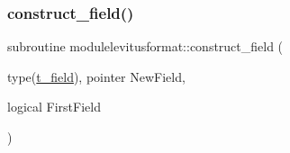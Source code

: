 \mbox{\label{namespacemodulelevitusformat_a1dfa75e5e2a006d4bcbca7bbb3e74ced}} 
\subsubsection{\texorpdfstring{construct\+\_\+field()}{construct\_field()}}
{\footnotesize\ttfamily subroutine modulelevitusformat\+::construct\+\_\+field (\begin{DoxyParamCaption}\item[{type(\mbox{\hyperlink{structmodulelevitusformat_1_1t__field}{t\+\_\+field}}), pointer}]{New\+Field,  }\item[{logical}]{First\+Field }\end{DoxyParamCaption})\hspace{0.3cm}{\ttfamily [private]}}

